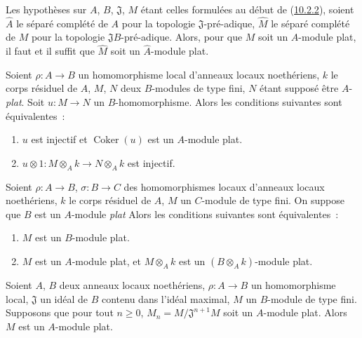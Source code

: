 \begin{env}[10.2.3]
\label{0.10.2.3-fr}
Les hypothèses sur $A$, $B$, $\mathfrak{J}$, $M$ étant celles formulées au
début de (\hyperref[0.10.2.2-fr]{10.2.2}), soient $\widehat A$ le séparé
complété de $A$ pour la topologie $\mathfrak{J}$-pré-adique, $\widehat M$ le
séparé complété de $M$ pour la topologie $\mathfrak{J}B$-pré-adique. Alors,
pour que $M$ soit un $A$-module plat, il faut et il suffit que $\widehat M$
soit un $\widehat A$-module plat.
\end{env}

\begin{env}[10.2.4]
\label{0.10.2.4-fr}
Soient $\rho:A\to B$ un homomorphisme local d'anneaux locaux noethériens, $k$
le corps résiduel de $A$, $M$, $N$ deux $B$-modules de type fini, $N$ étant
supposé être $A$-\emph{plat}. Soit $u:M\to N$ un $B$-homomorphisme. Alors les
conditions suivantes sont équivalentes~:
\begin{enumerate}
  \item[$a)$] $u$ est injectif et $\operatorname{Coker}(u)$ est un $A$-module plat.
  \item[$b)$] $u\otimes1:M\otimes_A k\to N\otimes_A k$ est injectif.
\end{enumerate}
\end{env}

\begin{env}[10.2.5]
\label{0.10.2.5-fr}
Soient $\rho:A\to B$, $\sigma:B\to C$ des homomorphismes locaux d'anneaux
locaux noethériens, $k$ le corps résiduel de $A$, $M$ un $C$-module de type
fini. On suppose que $B$ est un $A$-module \emph{plat} Alors les conditions
suivantes sont équivalentes~:
\begin{enumerate}
  \item[$a)$] $M$ est un $B$-module plat.
  \item[$b)$] $M$ est un $A$-module plat, et $M\otimes_A k$ est un
    $(B\otimes_A k)$-module plat.
\end{enumerate}
\end{env}

\begin{proposition}[10.2.6]
\label{0.10.2.6-fr}
Soient $A$, $B$ deux anneaux locaux noethériens, $\rho:A\to B$ un
homomorphisme local, $\mathfrak{J}$ un idéal de $B$ contenu dans l'idéal
maximal, $M$ un $B$-module de type fini. Supposons que pour tout $n\geq0$,
$M_n=M/\mathfrak{J}^{n+1}M$ soit un $A$-module plat. Alors $M$ est un
$A$-module plat.
\end{proposition}

